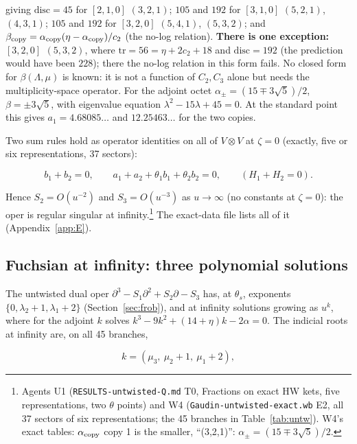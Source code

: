 \documentclass[11pt]{article}
\begin{document}
giving $\mathrm{disc}=45$ for $[2,1,0]$ $(3,2,1)$; $105$ and $192$ for $[3,1,0]$ $(5,2,1)$, $(4,3,1)$; $105$ and $192$ for $[3,2,0]$ $(5,4,1)$, $(5,3,2)$; and $\beta_{\rm copy}=\alpha_{\rm copy}(\eta-\alpha_{\rm copy})/c_2$ (the no-log relation).
\textbf{There is one exception: $[3,2,0]$ $(5,3,2)$}, where $\mathrm{tr}=56=\eta+2c_2+18$ and $\mathrm{disc}=192$ (the prediction would have been $228$); there the no-log relation in this form fails.
No closed form for $\beta(\Lambda,\mu)$ is known: it is not a function of $C_2,C_3$ alone but needs the multiplicity-space operator.
For the adjoint octet $\alpha_\pm=(15\mp3\sqrt5)/2$, $\beta=\pm3\sqrt5$, with eigenvalue equation $\lambda^2-15\lambda+45=0$. At the standard point this gives $a_1=4.68085\ldots$ and $12.25463\ldots$ for the two copies.

Two sum rules hold as operator identities on all of $V\otimes V$ at $\zeta=0$ (exactly, five or six representations, 37 sectors):

\begin{equation}
b_1+b_2=0,\qquad a_1+a_2+\theta_1b_1+\theta_2b_2=0,\qquad (H_1+H_2=0).\label{eq:sumrules0}
\end{equation}

Hence $S_2=O(u^{-2})$ and $S_3=O(u^{-3})$ as $u\to\infty$ (no constants at $\zeta=0$): the oper is regular singular at infinity.\footnote{Agents U1 (\texttt{RESULTS-\allowbreak{}untwisted-\allowbreak{}Q.\allowbreak{}md} T0, Fractions on exact HW kets, five representations, two $\theta$ points) and W4 (\texttt{Gaudin-\allowbreak{}untwisted-\allowbreak{}exact.\allowbreak{}wb} E2, all 37 sectors of six representations; the 45 branches in Table~\ref{tab:untw}).
W4's exact tables: $\alpha_{\rm copy}$ copy 1 is the smaller, ``(3,2,1)'': $\alpha_\pm=(15\mp3\sqrt5)/2$.} The exact-data file lists all of it (Appendix~\ref{app:E}).

\subsection{Fuchsian at infinity: three polynomial solutions}\label{sec:fuchs}

The untwisted dual oper $\partial^3-S_1\partial^2+S_2\partial-S_3$ has, at $\theta_s$, exponents $\{0,\lambda_2+1,\lambda_1+2\}$ (Section~\ref{sec:frob}), and at infinity solutions growing as $u^k$, where for the adjoint $k$ solves $k^3-9k^2+(14+\eta)k-2\alpha=0$. The indicial roots at infinity are, on all 45 branches,

\begin{equation}
k=(\mu_3,\ \mu_2+1,\ \mu_1+2),\label{eq:expinf}
\end{equation}
\end{document}
